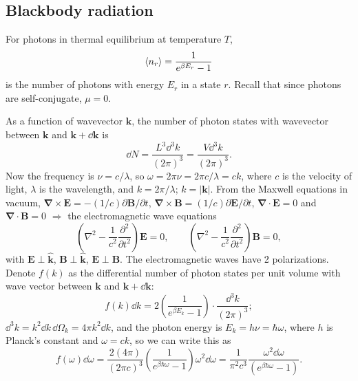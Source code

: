 \subsection{Blackbody radiation}

For photons in thermal equilibrium at temperature $T$,
\begin{equation}
  \langle n_r\rangle = \frac{1}{e^{\beta E_r}-1}
\end{equation}
is the number of photons with energy $E_r$ in a state $r$. Recall that since photons are self-conjugate, $\mu = 0$.

As a function of wavevector $\mathbf k$, the number of photon states with wavevector between $\mathbf k$ and
$\mathbf k+\dd\mathbf k$ is
\begin{equation}
  \dd N = \frac{L^3\dd^3k}{(2\pi)^3} = \frac{V\dd^3k}{(2\pi)^3}.
\end{equation}
Now the frequency is $\nu = c/\lambda$, so $\omega = 2\pi\nu = 2\pi c/\lambda = ck$, where $c$ is the velocity of
light, $\lambda$ is the wavelength, and $k = 2\pi/\lambda$; $k = |\mathbf k|$. From the Maxwell equations in vacuum,
$\boldsymbol\nabla\times\mathbf E = -(1/c)\partial\mathbf B/\partial t$,
$\boldsymbol\nabla\times\mathbf B = (1/c)\partial\mathbf E/\partial t$, $\boldsymbol\nabla\cdot\mathbf E = 0$ and
$\boldsymbol\nabla\cdot\mathbf B = 0$ $\Rightarrow$ the electromagnetic wave equations
\begin{equation}
  \left(\nabla^2-\frac{1}{c^2}\frac{\partial^2}{\partial t^2}\right)\mathbf E = 0,\qquad
  \left(\nabla^2-\frac{1}{c^2}\frac{\partial^2}{\partial t^2}\right)\mathbf B = 0,
\end{equation}
with $\mathbf E\perp\hat{\mathbf k}$, $\mathbf B\perp\hat{\mathbf k}$, $\mathbf E\perp\mathbf B$. The electromagnetic waves have 2
polarizations. Denote $f(k)$ as the differential number of photon states per unit volume with wave vector between $\mathbf k$ and
$\mathbf k+\dd\mathbf k$:
\begin{equation}
  f(k)\dd k = 2\left(\frac{1}{e^{\beta E_k}-1}\right)\cdot\frac{\dd^3k}{(2\pi)^3};
\end{equation}
$\dd^3k = k^2\dd k\,\dd\Omega_k = 4\pi k^2\dd k$, and the photon energy is $E_k = h\nu = \hbar\omega$, where $h$ is Planck's
constant and $\omega = ck$, so we can write this as
\begin{equation}
  f(\omega)\dd\omega = \frac{2(4\pi)}{(2\pi c)^3}\left(\frac{1}{e^{\beta\hbar\omega}-1}\right)\omega^2\dd\omega
  = \frac{1}{\pi^2c^3}\frac{\omega^2\dd\omega}{(e^{\beta\hbar\omega}-1)}.
\end{equation}
